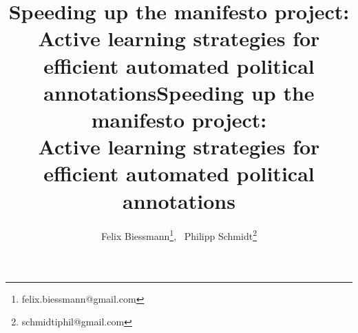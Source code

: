 \documentclass[runningheads,a4paper]{article}
\begin{document}

\title{Speeding up the manifesto project: Active learning strategies for efficient automated political annotations}

\title{Speeding up the manifesto project: \\ Active learning strategies for \\efficient automated political annotations}

%
%
\author{
Felix Biessmann\thanks{felix.biessmann@gmail.com},~ 
Philipp Schmidt\thanks{schmidtiphil@gmail.com}
}
%


%
%

\maketitle
\end{document}
